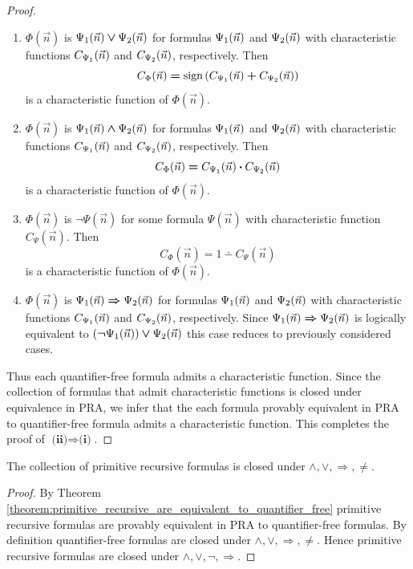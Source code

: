 \documentclass[10pt]{amsart}
\newcommand{\mra}{\boldsymbol{\Rightarrow}}
\newcommand{\mand}{\boldsymbol{\wedge}}
\newcommand{\mor}{\boldsymbol{\vee}}
\newcommand{\mneg}{\boldsymbol{\neg}}
\newcommand{\meq}{\boldsymbol{=}}
\newcommand{\mplus}{\boldsymbol{+}}
\newcommand{\mdot}{\boldsymbol{\cdot}}
\begin{document}
\begin{proof}
\begin{enumerate}[label=\textbf{(\arabic*)}, leftmargin=3.0em]
		\item $\Phi(\vec{n})$ is $\Psi_{\rm{1}}(\vec{n}) \mor \Psi_{\rm{2}}(\vec{n})$ for formulas $\Psi_{\rm{1}}(\vec{n})$ and $\Psi_{\rm{2}}(\vec{n})$ with characteristic functions $C_{\Psi_{\rm{1}}}(\vec{n})$ and $C_{\Psi_{\rm{2}}}(\vec{n})$, respectively. Then
		      $$C_{\Phi}(\vec{n}) \meq \mathrm{sign}\left(C_{\Psi_{\rm{1}}}(\vec{n}) \mplus C_{\Psi_{\rm{2}}}(\vec{n})\right)$$
		      is a characteristic function of $\Phi(\vec{n})$.
		\item $\Phi(\vec{n})$ is $\Psi_{\rm{1}}(\vec{n}) \mand \Psi_{\rm{2}}(\vec{n})$ for formulas $\Psi_{\rm{1}}(\vec{n})$ and $\Psi_{\rm{2}}(\vec{n})$ with characteristic functions $C_{\Psi_{\rm{1}}}(\vec{n})$ and $C_{\Psi_{\rm{2}}}(\vec{n})$, respectively. Then
		      $$C_{\Phi}(\vec{n}) \meq C_{\Psi_{\rm{1}}}(\vec{n}) \mdot C_{\Psi_{\rm{2}}}(\vec{n})$$
		      is a characteristic function of $\Phi(\vec{n})$.
		\item $\Phi(\vec{n})$ is $\mneg \Psi(\vec{n})$ for some formula $\Psi(\vec{n})$ with characteristic function $C_{\Psi}(\vec{n})$. Then
		      $$C_{\Phi}(\vec{n}) \meq 1 \dotminus C_{\Psi}(\vec{n})$$
		      is a characteristic function of $\Phi(\vec{n})$.
		\item $\Phi(\vec{n})$ is $\Psi_{\rm{1}}(\vec{n}) \mra \Psi_{\rm{2}}(\vec{n})$  for formulas $\Psi_{\rm{1}}(\vec{n})$ and $\Psi_{\rm{2}}(\vec{n})$ with characteristic functions $C_{\Psi_{\rm{1}}}(\vec{n})$ and $C_{\Psi_{\rm{2}}}(\vec{n})$, respectively. Since $\Psi_{\rm{1}}(\vec{n}) \mra \Psi_{\rm{2}}(\vec{n})$ is logically equivalent to $\left(\mneg \Psi_{\rm{1}}(\vec{n})\right) \mor \Psi_{\rm{2}}(\vec{n})$ this case reduces to previously considered cases.
	\end{enumerate}
	Thus each quantifier-free formula admits a characteristic function. Since the collection of formulas that admit characteristic functions is closed under equivalence in $\mathrm{PRA}$, we infer that the each formula provably equivalent in $\mathrm{PRA}$ to quantifier-free formula admits a characteristic function. This completes the proof of $\textbf{(ii)} \Rightarrow \textbf{(i)}$.
\end{proof}

\begin{corollary}\label{corollary:primitive_recursive_formulas_are_closed_under_connectives}
	The collection of primitive recursive formulas is closed under $\mand, \mor, \mra, \neq$.
\end{corollary}
\begin{proof}
	By Theorem \ref{theorem:primitive_recursive_are_equivalent_to_quantifier_free} primitive recursive formulas are provably equivalent in $\mathrm{PRA}$ to quantifier-free formulas. By definition quantifier-free fornulas are closed under $\mand, \mor, \mra, \neq$. Hence primitive recursive formulas are closed under $\mand, \mor, \mneg, \mra$.
\end{proof}
\end{document}
